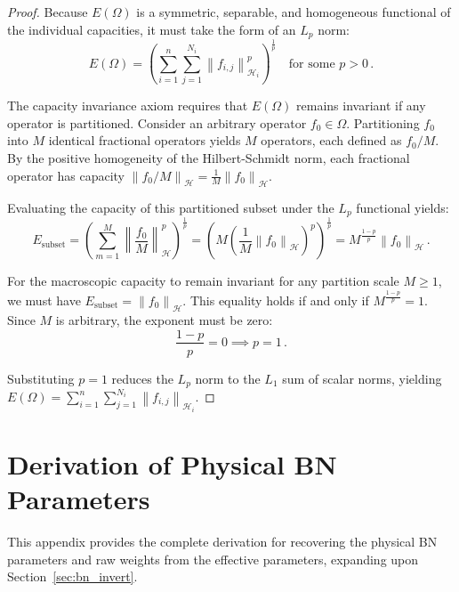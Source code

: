 \documentclass[11pt, a4paper, copyright, gdm]{google}
\newcommand{\norm}[1]{\left\lVert#1\right\rVert}
\newcommand{\calH}{\mathcal{H}}
\theoremstyle{definition}
\begin{document}
\begin{proof}
Because $E(\Omega)$ is a symmetric, separable, and homogeneous functional of the individual capacities, it must take the form of an $L_p$ norm:
\begin{equation}
E(\Omega) = \left( \sum_{i=1}^n \sum_{j=1}^{N_i} \norm{f_{i,j}}_{\calH_i}^p \right)^{\frac{1}{p}} \quad \text{for some } p > 0 \,.
\end{equation}

The capacity invariance axiom requires that $E(\Omega)$ remains invariant if any operator is partitioned. Consider an arbitrary operator $f_0 \in \Omega$. Partitioning $f_0$ into $M$ identical fractional operators yields $M$ operators, each defined as $f_0 / M$. By the positive homogeneity of the Hilbert-Schmidt norm, each fractional operator has capacity $\norm{f_0 / M}_{\calH} = \frac{1}{M} \norm{f_0}_{\calH}$.

Evaluating the capacity of this partitioned subset under the $L_p$ functional yields:
\begin{equation}
E_{\text{subset}} = \left( \sum_{m=1}^M \norm{\frac{f_0}{M}}_{\calH}^p \right)^{\frac{1}{p}} = \left( M \left( \frac{1}{M} \norm{f_0}_{\calH} \right)^p \right)^{\frac{1}{p}} = M^{\frac{1-p}{p}} \norm{f_0}_{\calH} \,.
\end{equation}

For the macroscopic capacity to remain invariant for any partition scale $M \ge 1$, we must have $E_{\text{subset}} = \norm{f_0}_{\calH}$. This equality holds if and only if $M^{\frac{1-p}{p}} = 1$. Since $M$ is arbitrary, the exponent must be zero:
\begin{equation}
\frac{1-p}{p} = 0 \implies p = 1 \,.
\end{equation}

Substituting $p=1$ reduces the $L_p$ norm to the $L_1$ sum of scalar norms, yielding $E(\Omega) = \sum_{i=1}^n \sum_{j=1}^{N_i} \norm{f_{i,j}}_{\calH_i}$.
\end{proof}

\section{Derivation of Physical BN Parameters}
\label{app:bn_inversion_details}

This appendix provides the complete derivation for recovering the physical BN parameters and raw weights from the effective parameters, expanding upon Section~\ref{sec:bn_invert}. 
\end{document}
